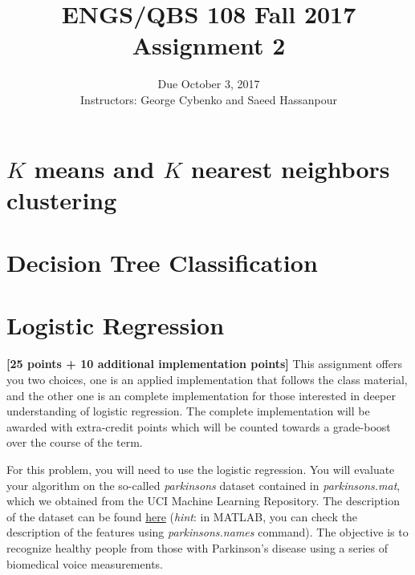 \documentclass[12pt]{article}
\begin{document}
 


\title{ENGS/QBS 108 Fall 2017 Assignment 2}
\author{Due October 3, 2017 \\ Instructors: George Cybenko and Saeed Hassanpour}
\date{}
\maketitle

\pagebreak

\section{$K$ means and $K$ nearest neighbors clustering}






\pagebreak


\section{Decision Tree Classification}







\pagebreak

\section{Logistic Regression} 
\textbf{[25 points + 10 additional implementation points]} 
This assignment offers you two choices, one is an applied implementation that follows the class material, and the other one is an complete implementation for those interested in deeper understanding of logistic regression. The complete implementation will be awarded with extra-credit points which will be counted towards a grade-boost over the course of the term. 

For this problem, you will need to use the logistic regression.
You will evaluate your algorithm on the so-called \textit{parkinsons} dataset contained in \textit{parkinsons.mat}, which we
obtained from the UCI Machine Learning Repository. The description of the dataset can be found \href{https://archive.ics.uci.edu/ml/datasets/parkinsons+telemonitoring}{here} (\textit{hint}: in MATLAB, you can check the description of the features using \textit{parkinsons.names} command). The objective is to recognize healthy people from those with Parkinson's disease using a series of biomedical voice measurements.
\end{document}
